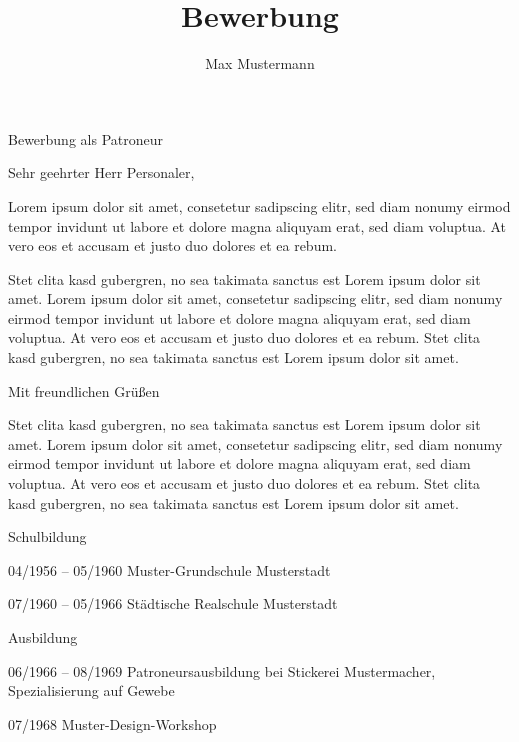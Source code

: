 \documentclass[german]{alpication}
\author{Max Mustermann}
\title{Bewerbung}
\begin{document}
% 
% 
\begin{correspondence}{Bewerbung als Patroneur}		%
	\opening{Sehr geehrter Herr Personaler,}	%

	Lorem ipsum dolor sit amet, consetetur sadipscing elitr, sed diam nonumy eirmod tempor invidunt ut labore
	et dolore magna aliquyam erat, sed diam voluptua. At vero eos et accusam et justo duo dolores et ea rebum.
	
	Stet clita kasd gubergren, no sea takimata sanctus est Lorem ipsum dolor sit amet. Lorem ipsum dolor sit amet,
	consetetur sadipscing elitr, sed diam nonumy eirmod tempor invidunt ut labore et dolore magna aliquyam erat,
	sed diam voluptua. At vero eos et accusam et justo duo dolores et ea rebum. Stet clita kasd gubergren, no sea
	takimata sanctus est Lorem ipsum dolor sit amet.

	\closing{Mit freundlichen Grüßen}
\end{correspondence}

% 
%
\begin{motivation}
	Stet clita kasd gubergren, no sea takimata sanctus est Lorem ipsum dolor sit amet. Lorem ipsum dolor sit amet,
	consetetur sadipscing elitr, sed diam nonumy eirmod tempor invidunt ut labore et dolore magna aliquyam erat,
	sed diam voluptua. At vero eos et accusam et justo duo dolores et ea rebum. Stet clita kasd gubergren, no sea
	takimata sanctus est Lorem ipsum dolor sit amet.
\end{motivation}


% 
% 
\begin{curriculumvitae}
	\begin{cvsection}{Schulbildung}
		\item [04/1956 -- 05/1960] 	Muster-Grundschule Musterstadt
		\item [07/1960 -- 05/1966] 	Städtische Realschule Musterstadt
	\end{cvsection}

	\begin{cvsection}{Ausbildung}
		\item [06/1966 -- 08/1969] 	Patroneursausbildung bei Stickerei Mustermacher, Spezialisierung auf Gewebe
		\item [07/1968]			Muster-Design-Workshop
	\end{cvsection}
\end{curriculumvitae}

% 
% 
\end{document}
